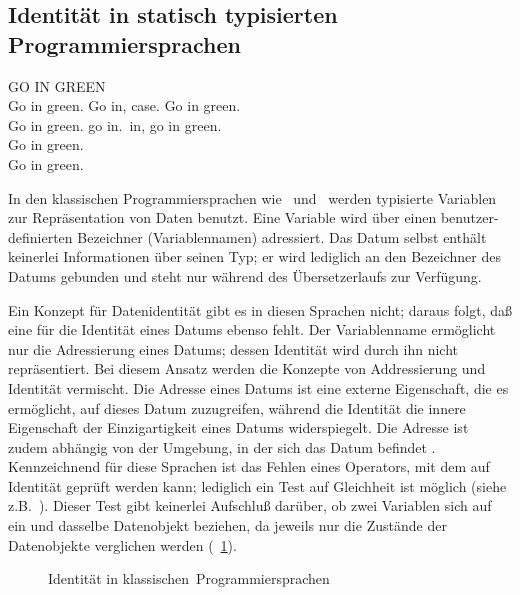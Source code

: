 \subsection{Identit\"{a}t in statisch typisierten Programmiersprachen}
%
\begin{fortune}[8cm]
GO IN GREEN\\[\smallskipamount]
Go in green. Go in, case. Go in green.\hspace*{\fill}\\
\hspace*{\fill}Go in green. go in.\ in, go in green.\\
\hspace*{\fill}Go in green.\\
\hspace*{\fill}Go in green.
\end{fortune}
%
In den klassischen Programmiersprachen wie \clogo\ und
\pascal\ werden typisierte Variablen zur Repr\"{a}sentation von Daten
benutzt.
Eine Variable wird \"{u}ber einen benutzer-definierten Bezeichner
(Variablennamen) adressiert. Das Datum selbst
enth\"{a}lt keinerlei Informationen \"{u}ber seinen Typ; er wird lediglich
an den Bezeichner des Datums gebunden und steht nur w\"{a}hrend des
\"{U}ber\-set\-zer\-laufs zur Verf\"{u}gung.
%
\par{}Ein Konzept f\"{u}r Datenidentit\"{a}t gibt es in diesen Sprachen
nicht; daraus folgt, da\ss{}
eine \representationform{} f\"{u}r die Identit\"{a}t eines Datums ebenso
fehlt. Der Variablenname erm\"{o}glicht nur die Adressierung eines
Datums; dessen Identit\"{a}t wird durch ihn nicht repr\"{a}sentiert.
Bei diesem Ansatz werden die Konzepte von Addressierung
und Identit\"{a}t vermischt. Die Adresse eines Datums ist eine
externe Eigenschaft, die es erm\"{o}glicht, auf dieses Datum zuzugreifen,
w\"{a}hrend die Identit\"{a}t die innere Eigenschaft der Einzigartigkeit
eines Datums widerspiegelt. Die Adresse ist zudem
abh\"{a}ngig von der Umgebung, in der sich das Datum befindet
\cite[]{bib:ko90}. Kennzeichnend f\"{u}r diese Sprachen ist
das Fehlen eines Operators, mit dem auf Identit\"{a}t
gepr\"{u}ft werden kann; lediglich ein Test auf Gleichheit ist
m\"{o}glich (siehe z.B.\ \cite[]{bib:wi83}). Dieser Test gibt
keinerlei Aufschlu\ss{} dar\"{u}ber, ob zwei Variablen sich auf ein und
dasselbe Datenobjekt beziehen, da jeweils nur die Zust\"{a}nde der
Datenobjekte verglichen werden (\figurename~\ref{fig:noiden}).
%
\begin{figure}[hbtp]%
\ifbuch%
\centerline{}%
\else%
\centerline{}%
\fi%
\caption{Identit\"{a}t in {\protect\rglq}klassischen{\protect\rgrq}\ 
  Programmiersprachen}\label{fig:noiden}%
\end{figure}%
